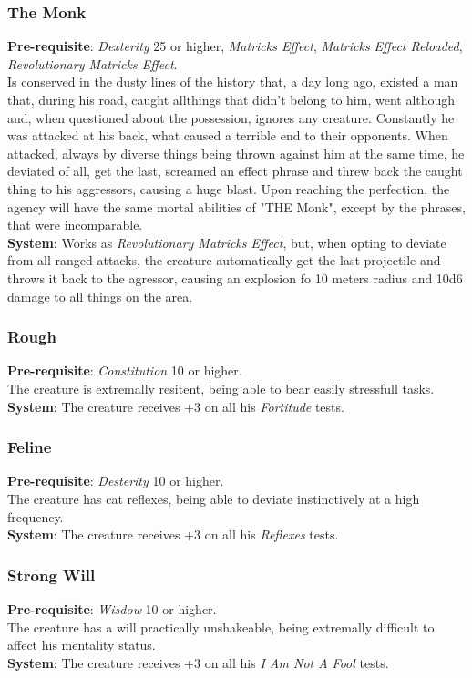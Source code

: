 \documentclass[ letterpaper,12pt]{article}
\begin{document}
\subsubsection{The Monk}
{\bf Pre-requisite}: {\it Dexterity} 25 or higher, {\it Matricks Effect}, {\it Matricks Effect Reloaded}, {\it Revolutionary Matricks Effect}.\\
Is conserved in the dusty lines of the history that, a day long ago, existed a man that, during his road, caught allthings that didn't belong to him, went although and, when questioned about the possession, ignores any creature. Constantly he was attacked at his back, what caused a terrible end to their opponents. When attacked, always by diverse things being thrown against him at the same time, he deviated of all, get the last, screamed an effect phrase and threw back the caught thing to his aggressors, causing a huge blast.  Upon reaching the perfection, the agency will have the same mortal abilities of "THE Monk", except by the phrases, that were incomparable.\\
{\bf System}: Works as {\it Revolutionary Matricks Effect}, but, when opting to deviate from all ranged attacks, the creature automatically get the last projectile and throws it back to the agressor, causing an explosion fo 10 meters radius and 10d6 damage to all things on the area.

\subsubsection{Rough}
{\bf Pre-requisite}: {\it Constitution} 10 or higher.\\
The creature is extremally resitent, being able to bear easily stressfull tasks.\\
{\bf System}: The creature receives +3 on all his {\it Fortitude} tests.

\subsubsection{Feline}
{\bf Pre-requisite}: {\it Desterity} 10 or higher.\\
The creature has cat reflexes, being able to deviate instinctively at a high frequency.\\
{\bf System}: The creature receives +3 on all his {\it Reflexes} tests.

\subsubsection{Strong Will}
{\bf Pre-requisite}: {\it Wisdow} 10 or higher.\\
The creature has a will practically unshakeable, being extremally difficult to affect his mentality status.\\
{\bf System}: The creature receives +3 on all his {\it I Am Not A Fool} tests.
\end{document}
